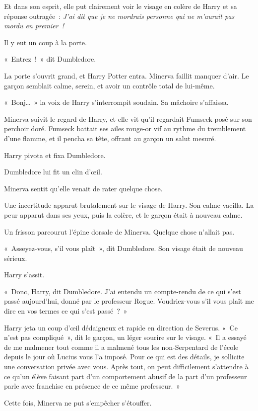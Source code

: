 Et dans son esprit, elle put clairement voir le visage en colère de Harry et sa réponse outragée~: \emph{J'ai dit que je ne mordrais personne qui ne m'aurait pas mordu en premier~!}

Il y eut un coup à la porte.

«~Entrez~!~»
dit Dumbledore.

La porte s'ouvrit grand, et Harry Potter entra.
Minerva faillit manquer d'air.
Le garçon semblait calme, serein, et avoir un contrôle total de lui-même.

«~Bonj…~» la voix de Harry s'interrompit soudain.
Sa mâchoire s'affaissa.

Minerva suivit le regard de Harry, et elle vit qu'il regardait Fumseck posé sur son perchoir doré.
Fumseck battait ses ailes rouge-or vif au rythme du tremblement d'une flamme, et il pencha sa tête, offrant au garçon un salut mesuré.

Harry pivota et fixa Dumbledore.

Dumbledore lui fit un clin d'œil.

Minerva sentit qu'elle venait de rater quelque chose.

Une incertitude apparut brutalement sur le visage de Harry.
Son calme vacilla.
La peur apparut dans ses yeux, puis la colère, et le garçon était à nouveau calme.

Un frisson parcourut l'épine dorsale de Minerva.
Quelque chose n'allait pas.

«~Asseyez-vous, s'il vous plaît~», dit Dumbledore.
Son visage était de nouveau sérieux.

Harry s'assit.

«~Donc, Harry, dit Dumbledore.
J'ai entendu un compte-rendu de ce qui s'est passé aujourd'hui, donné par le professeur Rogue.
Voudriez-vous s'il vous plaît me dire en vos termes ce qui s'est passé~?~»

Harry jeta un coup d'œil dédaigneux et rapide en direction de Severus.
«~Ce n'est pas compliqué~», dit le garçon, un léger sourire sur le visage.
«~Il a essayé de me malmener tout comme il a malmené tous les non-Serpentard de l'école depuis le jour où Lucius vous l'a imposé.
Pour ce qui est des détails, je sollicite une conversation privée avec vous.
Après tout, on peut difficilement s'attendre à ce qu'un élève faisant part d'un comportement abusif de la part d'un professeur parle avec franchise en présence de ce même professeur.~»

Cette fois, Minerva ne put s'empêcher s'étouffer.

